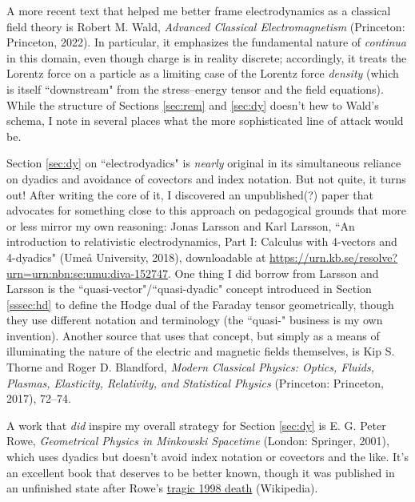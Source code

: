 \documentclass[12pt]{article}
\begin{document}
A more recent text that helped me better frame electrodynamics as a classical field theory is Robert M. Wald, \emph{Advanced Classical Electromagnetism} (Princeton: Princeton, 2022). In particular, it emphasizes the fundamental nature of \emph{continua} in this domain, even though charge is in reality discrete; accordingly, it treats the Lorentz force on a particle as a limiting case of the Lorentz force \emph{density} (which is itself ``downstream" from the stress--energy tensor and the field equations). While the structure of Sections \ref{sec:rem} and \ref{sec:dy} doesn't hew to Wald's schema, I note in several places what the more sophisticated line of attack would be.

Section \ref{sec:dy} on ``electrodyadics" is \emph{nearly} original in its simultaneous reliance on dyadics and avoidance of covectors and index notation. But not quite, it turns out! After writing the core of it, I discovered an unpublished(?) paper that advocates for something close to this approach on pedagogical grounds that more or less mirror my own reasoning: Jonas Larsson and Karl Larsson, ``An introduction to relativistic electrodynamics, Part I: Calculus with 4-vectors and 4-dyadics" (Ume\r{a} University, 2018), downloadable at {\url{https://urn.kb.se/resolve?urn=urn:nbn:se:umu:diva-152747}}. One thing I did borrow from Larsson and Larsson is the ``quasi-vector"/``quasi-dyadic" concept introduced in Section \ref{sssec:hd} to define the Hodge dual of the Faraday tensor geometrically, though they use different notation and terminology (the ``quasi-" business is my own invention). Another source that uses that concept, but simply as a means of illuminating the nature of the electric and magnetic fields themselves, is Kip S. Thorne and Roger D. Blandford, \emph{Modern Classical Physics: Optics, Fluids, Plasmas, Elasticity, Relativity, and Statistical Physics} (Princeton: Princeton, 2017), 72--74.

A work that \emph{did} inspire my overall strategy for Section \ref{sec:dy} is E. G. Peter Rowe, \emph{Geometrical Physics in Minkowski Spacetime} (London: Springer, 2001), which uses dyadics but doesn't avoid index notation or covectors and the like. It's an excellent book that deserves to be better known, though it was published in an unfinished state after Rowe's \href{https://en.wikipedia.org/wiki/December_1998_tourist_kidnappings_in_Yemen}{tragic 1998 death} (Wikipedia).
\end{document}
